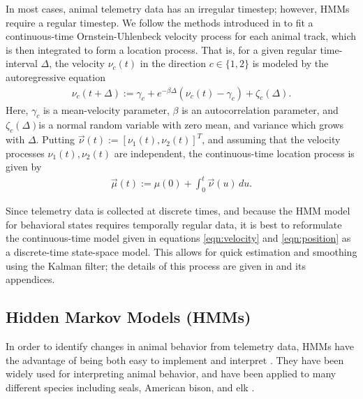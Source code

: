 \documentclass[12pt]{article}
\begin{document}
	In most cases, animal telemetry data has an irregular timestep; however, HMMs require a regular timestep. We follow the methods introduced in \cite{Johnson2008} to fit a continuous-time Ornstein-Uhlenbeck velocity process for each animal track, which is then integrated to form a location process. That is, for a given regular time-interval $\Delta$, the velocity $\nu_c(t)$ in the direction $c \in \{1, 2\}$ is modeled by the autoregressive equation
	\begin{align}
		\nu_c(t + \Delta) := \gamma_c + e^{-\beta \Delta} (\nu_c(t) - \gamma_c) + \zeta_c(\Delta). \label{eqn:velocity}
	\end{align}
	Here, $\gamma_c$ is a mean-velocity parameter, $\beta$ is an autocorrelation parameter, and $\zeta_c(\Delta)$is a normal random variable with zero mean, and variance which grows with $\Delta$. Putting $\vec \nu(t) := [\nu_1(t), \nu_2(t)]^T$, and assuming that the velocity processes $\nu_1(t), \nu_2(t)$ are independent, the continuous-time location process is given by
	\begin{align}
		\vec \mu(t) := \mu(0) + \int_0^t \vec \nu(u) \, du. \label{eqn:position}
	\end{align}
	
	Since telemetry data is collected at discrete times, and because the HMM model for behavioral states requires temporally regular data, it is best to reformulate the continuous-time model given in equations \eqref{eqn:velocity} and \eqref{eqn:position} as a discrete-time state-space model. This allows for quick estimation and smoothing using the Kalman filter; the details of this process are given in \cite{Johnson2008} and its appendices.
	
	\subsection{Hidden Markov Models (HMMs)} \label{sec:hmm}
	
	In order to identify changes in animal behavior from telemetry data, HMMs have the advantage of being both easy to implement and interpret \cite{McClintock2018}. They have been widely used for interpreting animal behavior, and have been applied to many different species including seals, American bison, and elk \cite{Jonsen2005, McClintock2012, Morales2004}.
	
\end{document}
